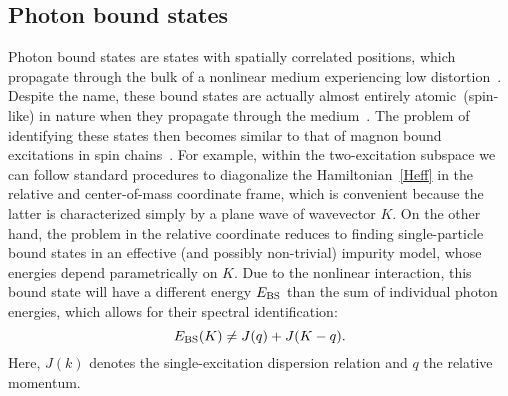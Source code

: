 \documentclass[pra,twocolumn,showpacs,preprintnumbers,amsmath,amssymb]{revtex4-1}
\begin{document}
 \subsection{Photon bound states}
Photon bound states are states with spatially correlated positions, which propagate through the bulk of a nonlinear medium experiencing low distortion~\cite{mahmo_calajo}. %
Despite the name, these bound states are actually almost entirely atomic~(spin-like) in nature when they propagate through the medium~\cite{chang_mirror,chang_tao}. The problem of identifying these states then becomes similar to that of magnon bound excitations in spin chains~\cite{Bethe,wortis}. For example, within the two-excitation subspace we can follow standard procedures to diagonalize the Hamiltonian~\eqref{Heff} in the relative and center-of-mass coordinate frame, which is convenient because the latter is characterized simply by a plane wave of wavevector $K$. On the other hand, the problem in the relative coordinate reduces to finding single-particle bound states in an effective (and possibly non-trivial) impurity model, whose energies depend parametrically on $K$. Due to the nonlinear interaction, this bound state will have a different energy $E_{\rm BS}$ than the sum of individual photon energies, which allows for their spectral identification:
 \begin{equation}\label{BS condition}
E_{\rm BS}(K)\ne J(q)+J(K-q).
\end{equation}
Here, $J(k)$ denotes the single-excitation dispersion relation and $q$ the relative momentum.
\end{document}
